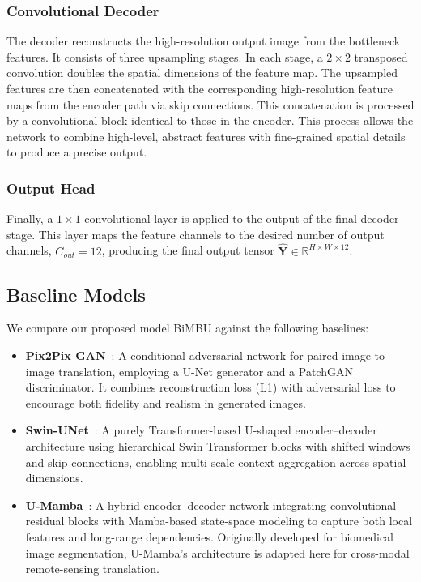 \subsubsection{Convolutional Decoder}
The decoder reconstructs the high-resolution output image from the bottleneck features. It consists of three upsampling stages. In each stage, a $2 \times 2$ transposed convolution doubles the spatial dimensions of the feature map. The upsampled features are then concatenated with the corresponding high-resolution feature maps from the encoder path via skip connections. This concatenation is processed by a convolutional block identical to those in the encoder. This process allows the network to combine high-level, abstract features with fine-grained spatial details to produce a precise output.

\subsubsection{Output Head}
Finally, a $1 \times 1$ convolutional layer is applied to the output of the final decoder stage. This layer maps the feature channels to the desired number of output channels, $C_{out}=12$, producing the final output tensor $\mathbf{\hat{Y}} \in \mathbb{R}^{H \times W \times 12}$.



\subsection{Baseline Models}
We compare our proposed model BiMBU against the following baselines:

\begin{itemize}
  \item \textbf{Pix2Pix GAN}~\cite{isola2017image}: A conditional adversarial network for paired image-to-image translation, employing a U-Net generator and a PatchGAN discriminator. It combines reconstruction loss (L1) with adversarial loss to encourage both fidelity and realism in generated images.

  \item \textbf{Swin-UNet}~\cite{swinunet2023}: A purely Transformer-based U-shaped encoder–decoder architecture using hierarchical Swin Transformer blocks with shifted windows and skip-connections, enabling multi-scale context aggregation across spatial dimensions. 

  \item \textbf{U-Mamba}~\cite{umamba2024}: A hybrid encoder–decoder network integrating convolutional residual blocks with Mamba-based state-space modeling to capture both local features and long-range dependencies. Originally developed for biomedical image segmentation, U-Mamba’s architecture is adapted here for cross-modal remote-sensing translation.
\end{itemize}

